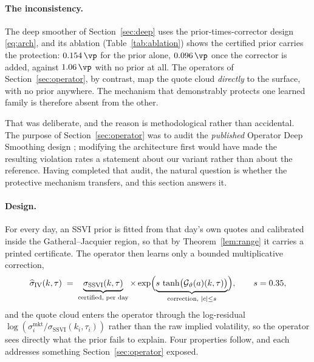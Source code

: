 \paragraph{The inconsistency.} The deep smoother of Section~\ref{sec:deep} uses the
prior-times-corrector design \eqref{eq:arch}, and its ablation (Table~\ref{tab:ablation}) shows
the certified prior carries the protection: $0.154\,\vp$ for the prior alone, $0.096\,\vp$ once
the corrector is added, against $1.06\,\vp$ with no prior at all. The operators of
Section~\ref{sec:operator}, by contrast, map the quote cloud \emph{directly} to the surface,
with no prior anywhere. The mechanism that demonstrably protects one learned family is therefore
absent from the other.

That was deliberate, and the reason is methodological rather than accidental. The purpose of
Section~\ref{sec:operator} was to audit the \emph{published} Operator Deep Smoothing design
\cite{wiedemann2025}; modifying the architecture first would have made the resulting violation
rates a statement about our variant rather than about the reference. Having completed that
audit, the natural question is whether the protective mechanism transfers, and this section
answers it.

\paragraph{Design.} For every day, an SSVI prior is fitted from that day's own quotes and
calibrated inside the Gatheral--Jacquier region, so that by Theorem~\ref{lem:range} it carries a
printed certificate. The operator then learns only a bounded multiplicative correction,
\begin{equation}\label{eq:prioroperator}
\widehat\sigma_{\mathrm{IV}}(k,\tau)\;=\;
\underbrace{\sigma_{\mathrm{SSVI}}(k,\tau)}_{\text{certified, per day}}\times
\exp\Bigl(\underbrace{s\,\tanh\bigl(\mathcal G_\vartheta(a)(k,\tau)\bigr)}_{\text{correction, }|c|\le s}\Bigr),
\qquad s=0.35,
\end{equation}
and the quote cloud enters the operator through the log-residual
$\log(\sigma^{\mathrm{mkt}}_i/\sigma_{\mathrm{SSVI}}(k_i,\tau_i))$ rather than the raw implied
volatility, so the operator sees directly what the prior fails to explain. Four properties
follow, and each addresses something Section~\ref{sec:operator} exposed.

